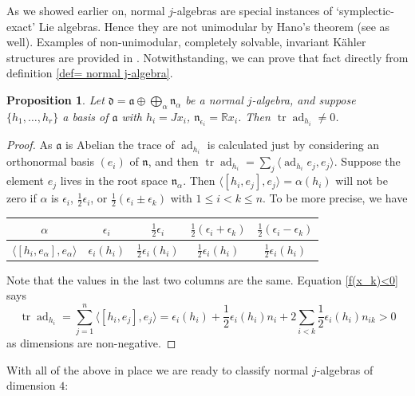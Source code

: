 \documentclass[12pt, twoside]{amsart}
\def\d{\mathfrak{d}}
\def\n{\mathfrak{n}}
\def\a{\mathfrak{a}}
\def\R{\mathbb{R}}
\def\ad{\operatorname{ad}}
\def\tr{\operatorname{tr}}
\newtheorem{prop}[definition]{Proposition}
\theoremstyle{definition}
\begin{document}
As we showed earlier on, normal $j$-algebras are special instances of  `symplectic-exact' Lie algebras. Hence they are not unimodular by Hano's theorem \cite{Hano} (see \cite[Proposition 3.4]{frob} as well). Examples of non-unimodular, completely solvable, invariant K{\"a}hler structures are provided in \cite{Gindikin-PS-V}.
Notwithstanding, we can prove that fact directly from definition \ref{def= normal j-algebra}.

\begin{prop} \label{traza en a}
Let $\d=\a\oplus \bigoplus_{\alpha} \n_{\alpha}$ be a normal $j$-algebra, and suppose $\{h_1, \ldots,  h_r \}$ a basis of $\a$ with $h_{i}=Jx_i$, $\n_{\epsilon_i}=\R x_i$. Then $\tr \ad_{h_i}\neq 0$.
\end{prop}

\begin{proof}
As  $\a$ is Abelian the trace of $\ad_{h_i}$ is calculated just by considering an orthonormal basis $(e_i)$ of $\n$, and then $\tr\ad_{h_i}={\sum}_j\langle \ad_{h_i} e_j, e_j \rangle$. 
Suppose the element $e_j$ lives in the root space $\n_\alpha$. Then $\langle [h_i, e_{j}],e_{j}\rangle= \alpha(h_i)$ will not be zero if $ \alpha$ is $\epsilon_i$, $\tfrac{1}{2}\epsilon_{i}$, or $\tfrac{1}{2}(\epsilon_{i} \pm \epsilon_{k})$ with $1\leq i<k \leq n$. To be more precise, we have

\begin{longtable}[c]{c || c | c | c | c } 
$ \alpha$ &  $\epsilon_i$ & $\tfrac{1}{2}\epsilon_{i}$ & $\tfrac{1}{2}(\epsilon_{i}+\epsilon_{k})$ & $\tfrac{1}{2}(\epsilon_{i}-\epsilon_{k})$ \\ \midrule
$\langle [h_{i},e_{\alpha}],e_{\alpha} \rangle$ & 
$\epsilon_{i}(h_i)$ & $\tfrac{1}{2}\epsilon_{i}(h_i)$ & $\tfrac{1}{2}\epsilon_{i}(h_i)$ & $\tfrac{1}{2}\epsilon_{i}(h_i)$
\end{longtable}

Note that the values in the last two columns are the same. 
Equation \eqref{f(x_k)<0} says 
\begin{equation} \label{eq: traza}
\tr\ad_{h_i}=\sum_{j=1}^n \langle [h_i,e_j],e_j\rangle=\epsilon_{i}(h_i)+ \frac{1}{2}\epsilon_{i}(h_i)n_{i}+2\sum_{i<k}\frac{1}{2}\epsilon_{i}(h_i)n_{ik}> 0
\end{equation}
as dimensions are non-negative.
\end{proof}
\bigbreak

With all of the above in place we are ready to classify normal $j$-algebras of dimension $4$:
\end{document}
